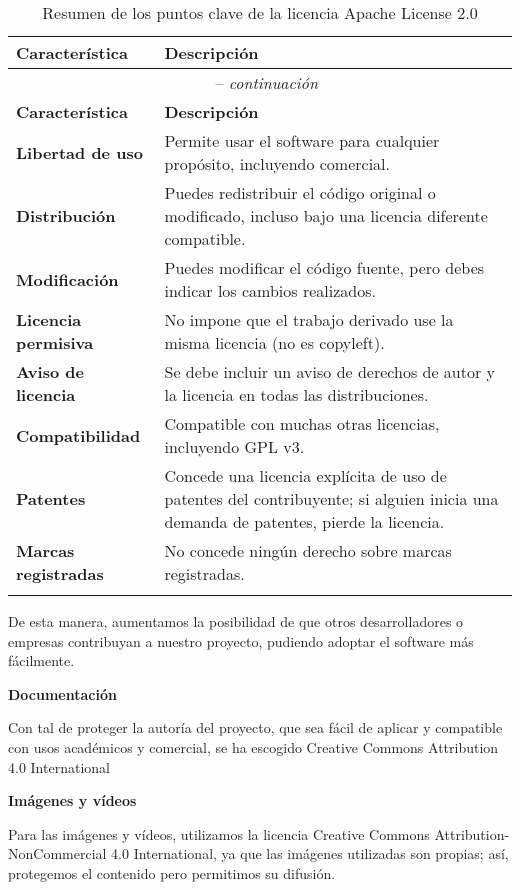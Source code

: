 \begin{longtable}[]{@{}p{}p{}@{}}
    \toprule
    \textbf{Característica} & \textbf{Descripción} \\
    \midrule
    \endfirsthead

    \multicolumn{2}{c}{\tablename\ \thetable{} -- \textit{continuación}} \\
    \toprule
    \textbf{Característica} & \textbf{Descripción} \\
    \midrule
    \endhead

    \textbf{Libertad de uso} & Permite usar el software para cualquier propósito, incluyendo comercial. \\
    \textbf{Distribución} & Puedes redistribuir el código original o modificado, incluso bajo una licencia diferente compatible. \\
    \textbf{Modificación} & Puedes modificar el código fuente, pero debes indicar los cambios realizados. \\
    \textbf{Licencia permisiva} & No impone que el trabajo derivado use la misma licencia (no es copyleft). \\
    \textbf{Aviso de licencia} & Se debe incluir un aviso de derechos de autor y la licencia en todas las distribuciones. \\
    \textbf{Compatibilidad} & Compatible con muchas otras licencias, incluyendo GPL v3. \\
    \textbf{Patentes} & Concede una licencia explícita de uso de patentes del contribuyente; si alguien inicia una demanda de patentes, pierde la licencia. \\
    \textbf{Marcas registradas} & No concede ningún derecho sobre marcas registradas. \\
    \bottomrule
    \caption{Resumen de los puntos clave de la licencia Apache License 2.0}
\end{longtable}

De esta manera, aumentamos la posibilidad de que otros desarrolladores o empresas contribuyan a nuestro proyecto, pudiendo
adoptar el software más fácilmente.


\textbf{Documentación}

Con tal de proteger la autoría del proyecto, que sea fácil de aplicar y compatible con usos académicos y comercial,
se ha escogido Creative Commons Attribution 4.0 International\cite{ccby4}

\textbf{Imágenes y vídeos}

Para las imágenes y vídeos, utilizamos la licencia Creative Commons Attribution-NonCommercial 4.0 International\cite{ccby_nc4},
ya que las imágenes utilizadas son propias; así, protegemos el contenido pero permitimos su difusión.



